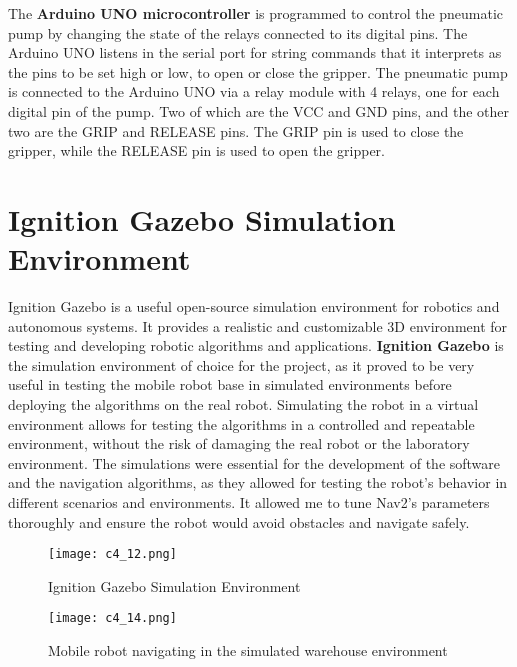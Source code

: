 The \textbf{Arduino UNO microcontroller} is programmed to control the pneumatic pump by changing
the state of the relays connected to its digital pins. The Arduino UNO listens in the serial port for string commands
that it interprets as the pins to be set high or low, to open or close the gripper. The pneumatic pump is connected
to the Arduino UNO via a relay module with 4 relays, one for each digital pin of the pump. Two of which
are the VCC and GND pins, and the other two are the GRIP and RELEASE pins. The GRIP pin is used to close the gripper,
while the RELEASE pin is used to open the gripper.


\section{Ignition Gazebo Simulation Environment}

Ignition Gazebo is a useful open-source simulation environment for robotics and autonomous systems.
It provides a realistic and customizable 3D environment for testing and developing robotic algorithms and applications.
\textbf{Ignition Gazebo} is the simulation environment of choice for the project,
as it proved to be very useful in testing the mobile robot base in simulated environments before deploying the algorithms
on the real robot. Simulating the robot in a virtual environment allows for testing the algorithms in 
a controlled and repeatable environment, without the risk of damaging the real robot or the laboratory environment.
The simulations were essential for the development of the software and the navigation algorithms, 
as they allowed for testing
the robot's behavior in different scenarios and environments. It allowed me to tune Nav2's parameters
thoroughly and ensure the robot would avoid obstacles and navigate safely.

\begin{figure}[t]
    \centering
    \texttt{[image: c4\_12.png]}
    \caption{Ignition Gazebo Simulation Environment}
    \label{fig:ignition}
\end{figure}

\begin{figure}[t]
    \centering
    \texttt{[image: c4\_14.png]}
    \caption{Mobile robot navigating in the simulated warehouse environment}
    \label{fig:warehousenav2}
\end{figure}

